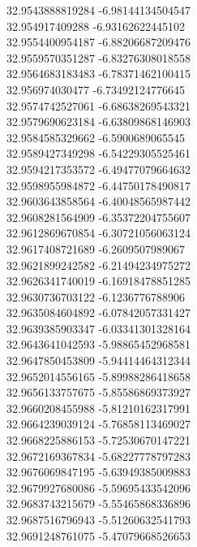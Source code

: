 {32.9543888819284	-6.98144134504547\\
32.954917409288	-6.93162622445102\\
32.9554400954187	-6.88206687209476\\
32.9559570351287	-6.83276308018558\\
32.9564683183483	-6.78371462100415\\
32.956974030477	-6.73492124776645\\
32.9574742527061	-6.68638269543321\\
32.9579690623184	-6.63809868146903\\
32.9584585329662	-6.5900689065545\\
32.9589427349298	-6.54229305525461\\
32.9594217353572	-6.49477079664632\\
32.9598955984872	-6.44750178490817\\
32.9603643858564	-6.40048565987442\\
32.9608281564909	-6.35372204755607\\
32.9612869670854	-6.30721056063124\\
32.9617408721689	-6.2609507989067\\
32.9621899242582	-6.21494234975272\\
32.9626341740019	-6.16918478851285\\
32.9630736703122	-6.1236776788906\\
32.9635084604892	-6.07842057331427\\
32.9639385903347	-6.03341301328164\\
32.9643641042593	-5.98865452968581\\
32.9647850453809	-5.94414464312344\\
32.9652014556165	-5.89988286418658\\
32.9656133757675	-5.85586869373927\\
32.9660208455988	-5.81210162317991\\
32.9664239039124	-5.76858113469027\\
32.9668225886153	-5.72530670147221\\
32.9672169367834	-5.68227778797283\\
32.9676069847195	-5.63949385009883\\
32.9679927680086	-5.59695433542096\\
32.9683743215679	-5.55465868336896\\
32.9687516796943	-5.51260632541793\\
32.9691248761075	-5.47079668526653\\
}
